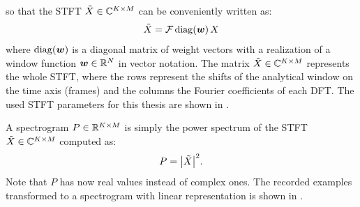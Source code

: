 so that the STFT $\tilde{X} \in \mathbb{C}^{K \times M}$ can be conveniently written as:
\begin{equation}\label{eq:signal_spec_stft_matrix}
  \tilde{X} = \mathcal{F} \mathop{\mathrm{diag}(\bm{w})} X
\end{equation}
where $\mathop{\mathrm{diag}(\bm{w})}$ is a diagonal matrix of weight vectors with a realization of a window function $\bm{w} \in \mathbb{R}^N$ in vector notation.
The matrix $\tilde{X} \in \mathbb{C}^{K \times M}$ represents the whole STFT, where the rows represent the shifts of the analytical window on the time axis (frames) and the columns the Fourier coefficients of each DFT.
The used STFT parameters for this thesis are shown in .

A spectrogram $P \in \mathbb{R}^{K \times M}$ is simply the power spectrum of the STFT $\tilde{X} \in \mathbb{C}^{K \times M}$ computed as:
\begin{equation}\label{eq:signal_spec_spec}
  P = \abs{\tilde{X}}^2.
\end{equation}
Note that $P$ has now real values instead of complex ones.
The recorded examples transformed to a spectrogram with linear representation is shown in .

